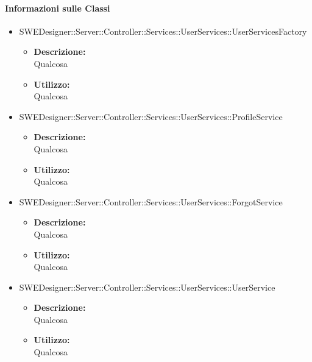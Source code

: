 		\paragraph{Informazioni sulle Classi}
		\begin{itemize}
			\item SWEDesigner::Server::Controller::Services::UserServices::UserServicesFactory
			\begin{itemize}
				\item \textbf{Descrizione: }\\
				Qualcosa
				\item \textbf{Utilizzo: }\\
				Qualcosa
			\end{itemize}
			\item SWEDesigner::Server::Controller::Services::UserServices::ProfileService
			\begin{itemize}
				\item \textbf{Descrizione: }\\
				Qualcosa
				\item \textbf{Utilizzo: }\\
				Qualcosa
			\end{itemize}
			\item SWEDesigner::Server::Controller::Services::UserServices::ForgotService
			\begin{itemize}
				\item \textbf{Descrizione: }\\
				Qualcosa
				\item \textbf{Utilizzo: }\\
				Qualcosa
			\end{itemize}
			\item SWEDesigner::Server::Controller::Services::UserServices::UserService
			\begin{itemize}
				\item \textbf{Descrizione: }\\
				Qualcosa
				\item \textbf{Utilizzo: }\\
				Qualcosa
			\end{itemize}
		\end{itemize}
		
